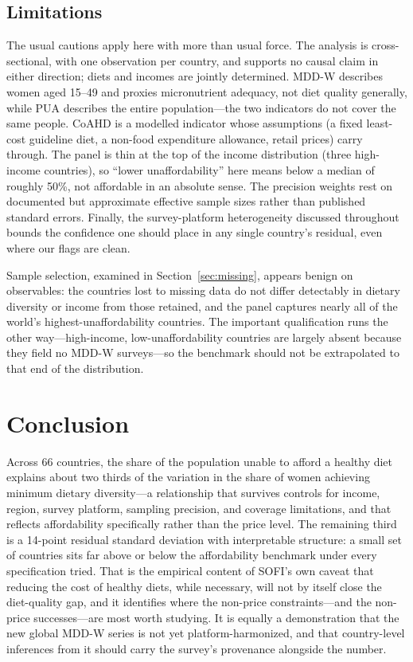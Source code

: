 \documentclass[11pt]{article}
\begin{document}
\subsection{Limitations}
The usual cautions apply here with more than usual force. The analysis is cross-sectional, with one observation per country, and supports no causal claim in either direction; diets and incomes are jointly determined. MDD-W describes women aged 15--49 and proxies micronutrient adequacy, not diet quality generally, while PUA describes the entire population---the two indicators do not cover the same people. CoAHD is a modelled indicator whose assumptions (a fixed least-cost guideline diet, a non-food expenditure allowance, retail prices) carry through. The panel is thin at the top of the income distribution (three high-income countries), so ``lower unaffordability'' here means below a median of roughly 50\%, not affordable in an absolute sense. The precision weights rest on documented but approximate effective sample sizes rather than published standard errors. Finally, the survey-platform heterogeneity discussed throughout bounds the confidence one should place in any single country's residual, even where our flags are clean.

Sample selection, examined in Section~\ref{sec:missing}, appears benign on observables: the countries lost to missing data do not differ detectably in dietary diversity or income from those retained, and the panel captures nearly all of the world's highest-unaffordability countries. The important qualification runs the other way---high-income, low-unaffordability countries are largely absent because they field no MDD-W surveys---so the benchmark should not be extrapolated to that end of the distribution.

\section{Conclusion}\label{sec:conclusion}

Across 66 countries, the share of the population unable to afford a healthy diet explains about two thirds of the variation in the share of women achieving minimum dietary diversity---a relationship that survives controls for income, region, survey platform, sampling precision, and coverage limitations, and that reflects affordability specifically rather than the price level. The remaining third is a 14-point residual standard deviation with interpretable structure: a small set of countries sits far above or below the affordability benchmark under every specification tried. That is the empirical content of SOFI's own caveat that reducing the cost of healthy diets, while necessary, will not by itself close the diet-quality gap, and it identifies where the non-price constraints---and the non-price successes---are most worth studying. It is equally a demonstration that the new global MDD-W series is not yet platform-harmonized, and that country-level inferences from it should carry the survey's provenance alongside the number.
\end{document}

